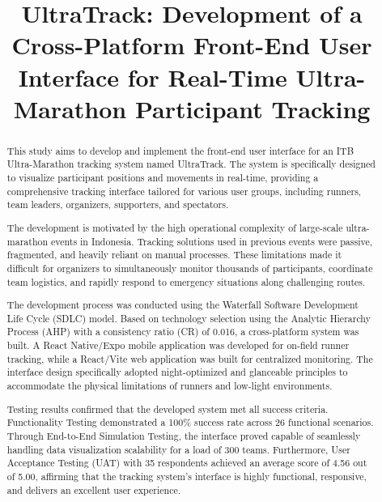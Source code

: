 \documentclass[conference]{IEEEtran}
\begin{document}
\title{UltraTrack: Development of a Cross-Platform Front-End User Interface for Real-Time Ultra-Marathon Participant Tracking}

\author{
}

\maketitle

\begin{abstract}
This study aims to develop and implement the front-end user interface for an ITB Ultra-Marathon tracking system named UltraTrack. The system is specifically designed to visualize participant positions and movements in real-time, providing a comprehensive tracking interface tailored for various user groups, including runners, team leaders, organizers, supporters, and spectators.

The development is motivated by the high operational complexity of large-scale ultra-marathon events in Indonesia. Tracking solutions used in previous events were passive, fragmented, and heavily reliant on manual processes. These limitations made it difficult for organizers to simultaneously monitor thousands of participants, coordinate team logistics, and rapidly respond to emergency situations along challenging routes.

The development process was conducted using the Waterfall Software Development Life Cycle (SDLC) model. Based on technology selection using the Analytic Hierarchy Process (AHP) with a consistency ratio (CR) of 0.016, a cross-platform system was built. A React Native/Expo mobile application was developed for on-field runner tracking, while a React/Vite web application was built for centralized monitoring. The interface design specifically adopted night-optimized and glanceable principles to accommodate the physical limitations of runners and low-light environments.

Testing results confirmed that the developed system met all success criteria. Functionality Testing demonstrated a 100\% success rate across 26 functional scenarios. Through End-to-End Simulation Testing, the interface proved capable of seamlessly handling data visualization scalability for a load of 300 teams. Furthermore, User Acceptance Testing (UAT) with 35 respondents achieved an average score of 4.56 out of 5.00, affirming that the tracking system's interface is highly functional, responsive, and delivers an excellent user experience.
\end{abstract}
\end{document}
